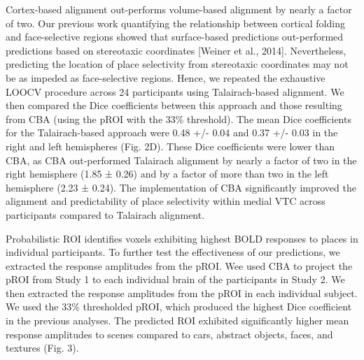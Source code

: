 Cortex-based alignment out-performs volume-based alignment by nearly a factor of
two.
%
Our previous work quantifying the relationship between cortical folding and
face-selective regions showed that surface-based predictions out-performed
predictions based on stereotaxic coordinates [Weiner et al., 2014].
%
Nevertheless, predicting the location of place selectivity from stereotaxic
coordinates may not be as impeded as face-selective regions.
%
Hence, we repeated the exhaustive LOOCV procedure across 24 participants using
Talairach-based alignment.
%
We then compared the Dice coefficients between this approach and those resulting
from CBA (using the pROI with the 33\% threshold).
%
The mean Dice coefficients for the Talairach-based approach were 0.48 +/- 0.04
and 0.37 +/- 0.03 in the right and left hemispheres (Fig. 2D).
%
These Dice coefficients were lower than CBA, as CBA out-performed Talairach
alignment by nearly a factor of two in the right hemisphere (1.85 ± 0.26) and by
a factor of more than two in the left hemisphere (2.23 ± 0.24).
%
The implementation of CBA significantly improved the alignment and
predictability of place selectivity within medial VTC across participants
compared to Talairach alignment.

Probabilistic ROI identifies voxels exhibiting highest BOLD responses to places
in individual participants.
%
To further test the effectiveness of our predictions, we extracted the response
amplitudes from the pROI.
%
Wee used CBA to project the pROI from Study 1 to each individual brain of the
participants in Study 2.
%
We then extracted the response amplitudes from the pROI in each individual
subject.
%
We used the 33\% thresholded pROI, which produced the highest Dice coefficient
in the previous analyses.
%
The predicted ROI exhibited significantly higher mean response amplitudes to
scenes compared to cars, abstract objects, faces, and textures (Fig. 3).

